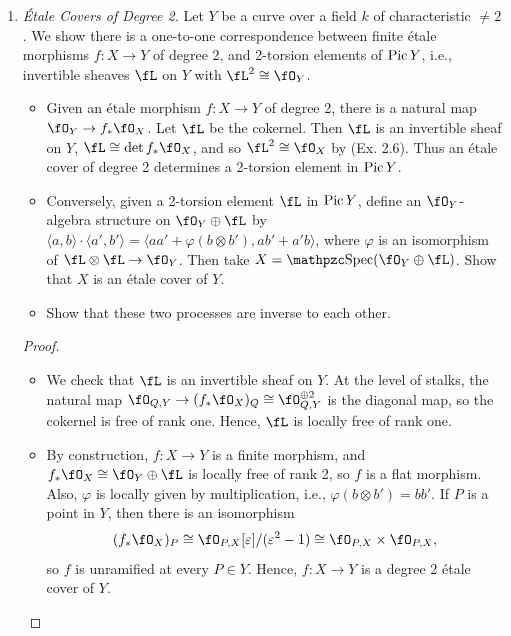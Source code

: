 \documentclass[a4paper]{article}
\begin{document}
\begin{enumerate} [label=\textbf{\arabic*.}, leftmargin=0em]
  \item \textit{Étale Covers of Degree 2.} Let $Y$ be a curve over a field $k$ of characteristic $\neq 2$.
        We show there is a one-to-one correspondence between finite étale morphisms $f : X \to Y$ of degree 2, and 2-torsion elements of $\operatorname{Pic}{Y}$, i.e., invertible sheaves $\fL$ on $Y$ with $\fL^2 \cong \fO_Y$.
        \begin{itemize}
          \item[(a)] Given an étale morphism $f : X \to Y$ of degree 2, there is a natural map $\fO_Y \to f_*\fO_X$.
                Let $\fL$ be the cokernel.
                Then $\fL$ is an invertible sheaf on $Y$, $\fL \cong \det f_*\fO_X$, and so $\fL^2 \cong \fO_X$ by (Ex. 2.6).
                Thus an étale cover of degree 2 determines a 2-torsion element in $\operatorname{Pic}{Y}$.
          \item[(b)] Conversely, given a 2-torsion element $\fL$ in $\operatorname{Pic}{Y}$, define an $\fO_Y$-algebra structure on $\fO_Y \oplus \fL$ by $\langle a, b \rangle \cdot \langle a', b' \rangle = \langle aa' + \varphi(b \otimes b'), ab' + a'b \rangle$, where $\varphi$ is an isomorphism of $\fL \otimes \fL \to \fO_Y$.
                Then take $X = \rSpec(\fO_Y \oplus \fL)$.
                Show that $X$ is an étale cover of $Y$.
          \item[(c)] Show that these two processes are inverse to each other.
        \end{itemize}

        \begin{proof} $ $ \vspace{0pt}
          \begin{itemize} [leftmargin=0cm]
            \item[(a)] We check that $\fL$ is an invertible sheaf on $Y$.
                  At the level of stalks, the natural map $\fO_{Q, Y} \to (f_*\fO_X)_Q \cong \fO_{Q, Y}^{\oplus 2}$ is the diagonal map, so the cokernel is free of rank one.
                  Hence, $\fL$ is locally free of rank one.

            \item[(b)] By construction, $f : X \to Y$ is a finite morphism, and $f_*\fO_X \cong \fO_Y \oplus \fL$ is locally free of rank 2, so $f$ is a flat morphism.
                  Also, $\varphi$ is locally given by multiplication, i.e., $\varphi(b \otimes b') = bb'$.
                  If $P$ is a point in $Y$, then there is an isomorphism $$(f_*\fO_X)_P \cong \fO_{P, X}[\varepsilon] / (\varepsilon^2 - 1) \cong \fO_{P, X} \times \fO_{P, X},$$
                  so $f$ is unramified at every $P \in Y$.
                  Hence, $f : X \to Y$ is a degree 2 étale cover of $Y$.


\end{itemize}
\end{proof}
\end{enumerate}
\end{document}
